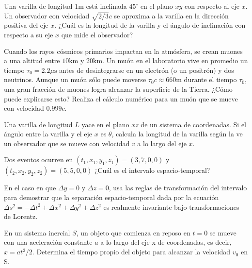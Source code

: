\documentclass[12pt]{article}
\newenvironment{exercise}[2][Ejercicio]{\begin{trivlist} 
\item[\hskip \labelsep {\bfseries #1}\hskip \labelsep {\bfseries #2.}]}{\end{trivlist}}
\begin{document}
\begin{exercise}{1.4} Una varilla de longitud $1 \text{m}$ está inclinada $45^\circ$ en el plano $xy$ con respecto al eje $x$. Un observador con velocidad $\sqrt{2/3}c$ se aproxima a la varilla en la dirección positiva del eje $x$. ¿Cuál es la longitud de la varilla y el ángulo de inclinación con respecto a su eje $x$ que mide el observador?
\end{exercise}

\begin{exercise}{1.5} Cuando los rayos cósmicos primarios impactan en la atmósfera, se crean muones a una altitud entre $10 \text{km}$ y $20 \text{km}$. Un muón en el laboratorio vive en promedio un tiempo $\tau_0 = 2.2 \mu\text{s}$ antes de desintegrarse en un electrón (o un positrón) y dos neutrinos. Aunque un muón sólo puede moverse $\tau_0 c \approx 660 \text{m}$ durante el tiempo $\tau_0$, una gran fracción de muones logra alcanzar la superficie de la Tierra. ¿Cómo puede explicarse esto? Realiza el cálculo numérico para un muón que se mueve con velocidad $0.999c$.
\end{exercise}

\begin{exercise}{1.6}
Una varilla de longitud $L$ yace en el plano $xz$ de un sistema de coordenadas. Si el ángulo entre la varilla y el eje $x$ es $\theta$, calcula la longitud de la varilla según la ve un observador que se mueve con velocidad $v$ a lo largo del eje $x$.    
\end{exercise}

\begin{exercise}{1.7}
Dos eventos ocurren en $(t_1, x_1, y_1, z_1)=(3, 7, 0, 0)$ y $(t_2, x_2, y_2, z_2)=(5, 5, 0, 0)$ ¿Cuál es el intervalo espacio-temporal?    
\end{exercise}

\begin{exercise}{1.8}
En el caso en que $\Delta y =0$ y $\Delta z =0$, usa las reglas de transformación del intervalo para demostrar que la separación espacio-temporal dada por la ecuación $\Delta s^2 = - \Delta t^2 + \Delta x^2 + \Delta y^2 + \Delta z^2$ es realmente invariante bajo transformaciones de Lorentz.
\end{exercise}  

\begin{exercise}{1.9}
En un sistema inercial $S$, un objeto que comienza en reposo en $t=0$ se mueve con una aceleración constante $a$ a lo largo del eje x de coordenadas, es decir, $x=at^2/2$. Determina el tiempo propio del objeto para alcanzar la velocidad $v_0$ en S.
\end{exercise}
\end{document}
